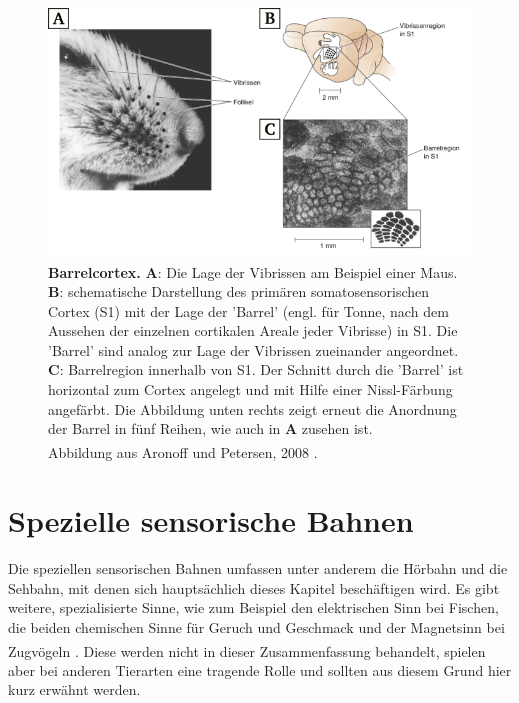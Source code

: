 \documentclass[12pt,a4paper,pdftex]{article}
\begin{document}
\begin{figure}[H]
    \centering
    \includegraphics[width = \textwidth] {pictures/somatosensory/barrelcortex.png}
    \caption[Barrelcortex]{\textbf{Barrelcortex.} \textbf{A}: Die Lage der Vibrissen am Beispiel einer Maus. \textbf{B}: schematische Darstellung des primären somatosensorischen Cortex (S1) mit der Lage der 'Barrel' (engl. für Tonne, nach dem Aussehen der einzelnen cortikalen Areale jeder Vibrisse) in S1. Die 'Barrel' sind analog zur Lage der Vibrissen zueinander angeordnet. \textbf{C}: Barrelregion innerhalb von S1. Der Schnitt durch die 'Barrel' ist horizontal zum Cortex angelegt und mit Hilfe einer Nissl-Färbung angefärbt. Die Abbildung unten rechts zeigt erneut die Anordnung der Barrel in fünf Reihen, wie auch in \textbf{A} zusehen ist. \\
    Abbildung aus Aronoff und Petersen, 2008 \textsuperscript{\cite{barrelcortex2008}}.}
    \label{fig:barrelcortex}
\end{figure}


\newpage
\section{Spezielle sensorische Bahnen}
\label{sec:spezsens}
Die speziellen sensorischen Bahnen umfassen unter anderem die Hörbahn   und die Sehbahn, mit denen sich hauptsächlich dieses Kapitel beschäftigen wird. Es gibt weitere, spezialisierte Sinne, wie zum Beispiel den elektrischen Sinn bei Fischen, die beiden chemischen Sinne für Geruch und Geschmack und der Magnetsinn bei Zugvögeln \textsuperscript{\cite{smith2008biology}}. Diese werden nicht in dieser Zusammenfassung behandelt, spielen aber bei anderen Tierarten eine tragende Rolle und sollten aus diesem Grund hier kurz erwähnt werden.
\end{document}

